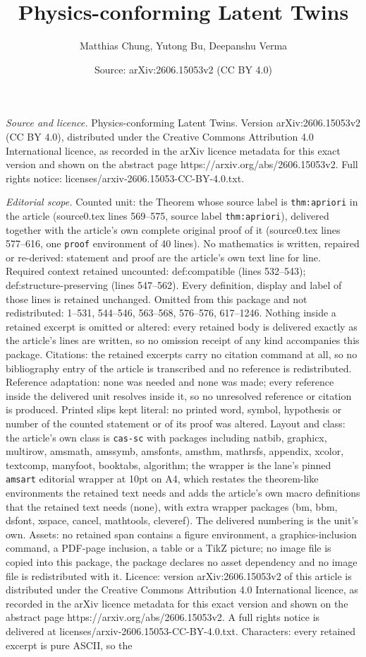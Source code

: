 \documentclass[10pt,a4paper]{amsart}
\title[Physics-conforming Latent Twins]{Physics-conforming Latent Twins}
\author{Matthias Chung, Yutong Bu, Deepanshu Verma}
\date{Source: arXiv:2606.15053v2 (CC BY 4.0)}
\begin{document}
\maketitle

\noindent\emph{Source and licence.} Physics-conforming Latent Twins. Version arXiv:2606.15053v2 (CC BY 4.0), distributed under the Creative Commons Attribution 4.0 International licence, as recorded in the arXiv licence metadata for this exact version and shown on the abstract page https://arxiv.org/abs/2606.15053v2. Full rights notice: licenses/arxiv-2606.15053-CC-BY-4.0.txt.\par\smallskip

\noindent\textit{Editorial scope.} Counted unit: the Theorem whose source label is \texttt{thm:apriori} in the article (source0.tex lines 569--575, source label \texttt{thm:apriori}), delivered together with the article's own complete original proof of it (source0.tex lines 577--616, one \texttt{proof} environment of 40 lines). No mathematics is written, repaired or re-derived: statement and proof are the article's own text line for line. Required context retained uncounted: def:compatible (lines 532--543); def:structure-preserving (lines 547--562). Every definition, display and label of those lines is retained unchanged. Omitted from this package and not redistributed: 1--531, 544--546, 563--568, 576--576, 617--1246. Nothing inside a retained excerpt is omitted or altered: every retained body is delivered exactly as the article's lines are written, so no omission receipt of any kind accompanies this package. Citations: the retained excerpts carry no citation command at all, so no bibliography entry of the article is transcribed and no reference is redistributed. Reference adaptation: none was needed and none was made; every reference inside the delivered unit resolves inside it, so no unresolved reference or citation is produced. Printed slips kept literal: no printed word, symbol, hypothesis or number of the counted statement or of its proof was altered. Layout and class: the article's own class is \texttt{cas-sc} with packages including natbib, graphicx, multirow, amsmath, amssymb, amsfonts, amsthm, mathrsfs, appendix, xcolor, textcomp, manyfoot, booktabs, algorithm; the wrapper is the lane's pinned \texttt{amsart} editorial wrapper at 10pt on A4, which restates the theorem-like environments the retained text needs and adds the article's own macro definitions that the retained text needs (none), with extra wrapper packages (bm, bbm, dsfont, xspace, cancel, mathtools, cleveref). The delivered numbering is the unit's own. Assets: no retained span contains a figure environment, a graphics-inclusion command, a PDF-page inclusion, a table or a TikZ picture; no image file is copied into this package, the package declares no asset dependency and no image file is redistributed with it. Licence: version arXiv:2606.15053v2 of this article is distributed under the Creative Commons Attribution 4.0 International licence, as recorded in the arXiv licence metadata for this exact version and shown on the abstract page https://arxiv.org/abs/2606.15053v2. A full rights notice is delivered at licenses/arxiv-2606.15053-CC-BY-4.0.txt. Characters: every retained excerpt is pure ASCII, so the 
\end{document}
